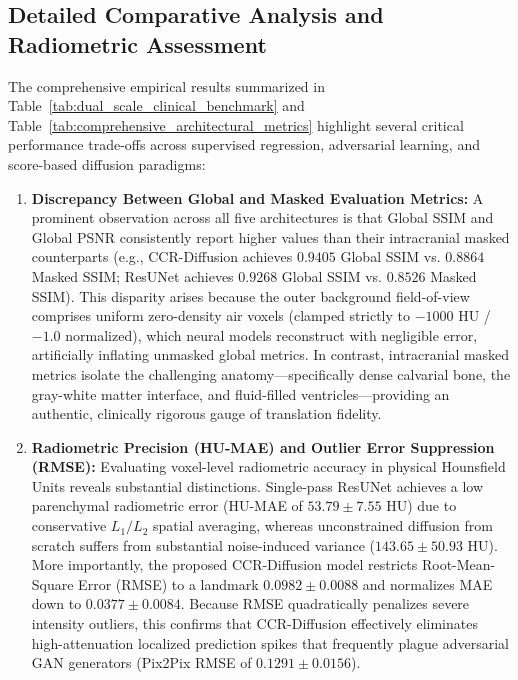 \subsection{Detailed Comparative Analysis and Radiometric Assessment}
The comprehensive empirical results summarized in Table~\ref{tab:dual_scale_clinical_benchmark} and Table~\ref{tab:comprehensive_architectural_metrics} highlight several critical performance trade-offs across supervised regression, adversarial learning, and score-based diffusion paradigms:
\begin{enumerate}
    \item \textbf{Discrepancy Between Global and Masked Evaluation Metrics:} A prominent observation across all five architectures is that Global SSIM and Global PSNR consistently report higher values than their intracranial masked counterparts (e.g., CCR-Diffusion achieves $0.9405$ Global SSIM vs. $0.8864$ Masked SSIM; ResUNet achieves $0.9268$ Global SSIM vs. $0.8526$ Masked SSIM). This disparity arises because the outer background field-of-view comprises uniform zero-density air voxels (clamped strictly to $-1000\text{ HU}$ / $-1.0$ normalized), which neural models reconstruct with negligible error, artificially inflating unmasked global metrics. In contrast, intracranial masked metrics isolate the challenging anatomy---specifically dense calvarial bone, the gray-white matter interface, and fluid-filled ventricles---providing an authentic, clinically rigorous gauge of translation fidelity.
    \item \textbf{Radiometric Precision (HU-MAE) and Outlier Error Suppression (RMSE):} Evaluating voxel-level radiometric accuracy in physical Hounsfield Units reveals substantial distinctions. Single-pass ResUNet achieves a low parenchymal radiometric error (HU-MAE of $53.79 \pm 7.55\text{ HU}$) due to conservative $L_1/L_2$ spatial averaging, whereas unconstrained diffusion from scratch suffers from substantial noise-induced variance ($143.65 \pm 50.93\text{ HU}$). More importantly, the proposed CCR-Diffusion model restricts Root-Mean-Square Error (RMSE) to a landmark $0.0982 \pm 0.0088$ and normalizes MAE down to $0.0377 \pm 0.0084$. Because RMSE quadratically penalizes severe intensity outliers, this confirms that CCR-Diffusion effectively eliminates high-attenuation localized prediction spikes that frequently plague adversarial GAN generators (Pix2Pix RMSE of $0.1291 \pm 0.0156$).

\end{enumerate}
